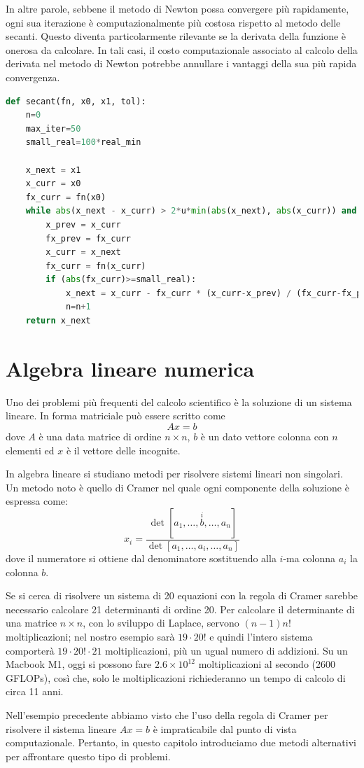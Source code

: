 \documentclass{article}
\begin{document}
In altre parole, sebbene il metodo di Newton possa convergere più rapidamente,
ogni sua iterazione è computazionalmente più costosa rispetto al metodo delle
secanti. Questo diventa particolarmente rilevante se la derivata della
funzione è onerosa da calcolare. In tali casi, il costo computazionale
associato al calcolo della derivata nel metodo di Newton potrebbe annullare i
vantaggi della sua più rapida convergenza.

\begin{lstlisting}[language=Python]
def secant(fn, x0, x1, tol):
    n=0
    max_iter=50
    small_real=100*real_min
    
    x_next = x1
    x_curr = x0
    fx_curr = fn(x0)
    while abs(x_next - x_curr) > 2*u*min(abs(x_next), abs(x_curr)) and n < max_iter:
        x_prev = x_curr
        fx_prev = fx_curr
        x_curr = x_next
        fx_curr = fn(x_curr)
        if (abs(fx_curr)>=small_real):
            x_next = x_curr - fx_curr * (x_curr-x_prev) / (fx_curr-fx_prev)
            n=n+1
    return x_next
\end{lstlisting}
\newpage
\section{Algebra lineare numerica}
Uno dei problemi più frequenti del calcolo scientifico è la soluzione di un
sistema lineare. In forma matriciale può essere scritto come 
$$Ax=b$$
dove $A$ è una data matrice di ordine $n\times n$, $b$ è un dato vettore
colonna con $n$ elementi ed $x$ è il vettore delle incognite.

In algebra lineare si studiano metodi per risolvere sistemi lineari non
singolari. Un metodo noto è quello di Cramer nel quale ogni componente della
soluzione è espressa come:
$$x_i = \frac{\det\left[a_1, \ldots, \overset{i}{b}, \ldots, a_n\right]}{\det\left[a_1, \ldots, a_i, \ldots, a_n\right]}$$
dove il numeratore si ottiene dal denominatore sostituendo alla $i$-ma colonna
$a_i$ la colonna $b$.
\begin{example}
   Se si cerca di risolvere un sistema di 20 equazioni con la regola di Cramer
   sarebbe necessario calcolare 21 determinanti di ordine 20. Per calcolare il
   determinante di una matrice $n\times n$, con lo sviluppo di Laplace,
   servono $(n-1)n!$ moltiplicazioni; nel nostro esempio sarà $19\cdot20!$ e
   quindi l'intero sistema comporterà $19\cdot20!\cdot21$ moltiplicazioni, più
   un ugual numero di addizioni. Su un Macbook M1, oggi si possono fare
   $2.6\times10^{12}$ moltiplicazioni al secondo (2600 GFLOPs), così che, solo
   le moltiplicazioni richiederanno un tempo di calcolo di circa 11 anni.
\end{example}
Nell'esempio precedente abbiamo visto che l'uso della regola di Cramer per
risolvere il sistema lineare $Ax=b$ è impraticabile dal punto di vista
computazionale. Pertanto, in questo capitolo introduciamo due metodi
alternativi per affrontare questo tipo di problemi.
\end{document}
